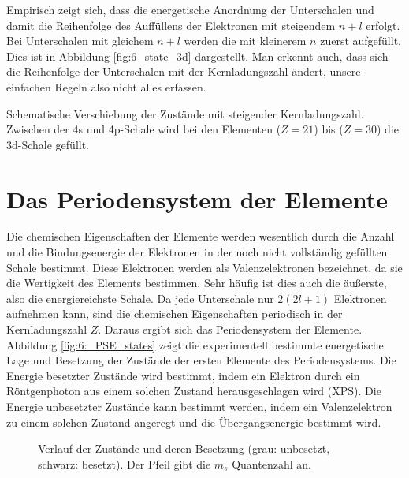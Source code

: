 Empirisch zeigt sich, dass die energetische Anordnung der Unterschalen und damit die Reihenfolge des Auffüllens der Elektronen mit steigendem $n+l$ erfolgt. Bei Unterschalen mit gleichem $n+l$ werden die mit kleinerem $n$ zuerst aufgefüllt. Dies ist in Abbildung  \ref{fig:6_state_3d} dargestellt. Man erkennt auch, dass sich die Reihenfolge der Unterschalen mit der Kernladungszahl ändert, unsere einfachen Regeln also nicht alles erfassen.


\begin{marginfigure}
    \caption{Schematische Verschiebung der Zustände mit steigender Kernladungszahl. Zwischen der 4s und 4p-Schale wird bei den Elementen   ($Z=21$) bis  ($Z=30$) die 3d-Schale gefüllt.}
    \label{fig:6_state_3d}
\end{marginfigure}

\section{Das Periodensystem der Elemente}

Die chemischen Eigenschaften der Elemente werden wesentlich durch die Anzahl und die Bindungsenergie der Elektronen in der noch nicht vollständig gefüllten Schale bestimmt. Diese Elektronen werden als Valenzelektronen bezeichnet, da sie die Wertigkeit des Elements bestimmen. Sehr häufig ist dies auch die äußerste, also die energiereichste Schale. Da jede Unterschale nur $2 (2l +1)$ Elektronen aufnehmen kann, sind die chemischen Eigenschaften periodisch in der Kernladungszahl $Z$. Daraus ergibt sich das Periodensystem der Elemente. Abbildung \ref{fig:6:_PSE_states} zeigt die experimentell bestimmte energetische Lage und Besetzung der Zustände der ersten Elemente des Periodensystems. Die Energie besetzter Zustände wird bestimmt, indem ein Elektron durch ein Röntgenphoton aus einem solchen Zustand herausgeschlagen wird (XPS). Die Energie unbesetzter Zustände kann bestimmt werden, indem ein Valenzelektron zu einem solchen Zustand angeregt und die Übergangsenergie bestimmt wird.

\begin{figure}
    \caption{Verlauf der Zustände und deren Besetzung (grau: unbesetzt, schwarz: besetzt). Der Pfeil gibt die $m_s$ Quantenzahl an.}
    \label{fig:6_PSE_states}
\end{figure}

